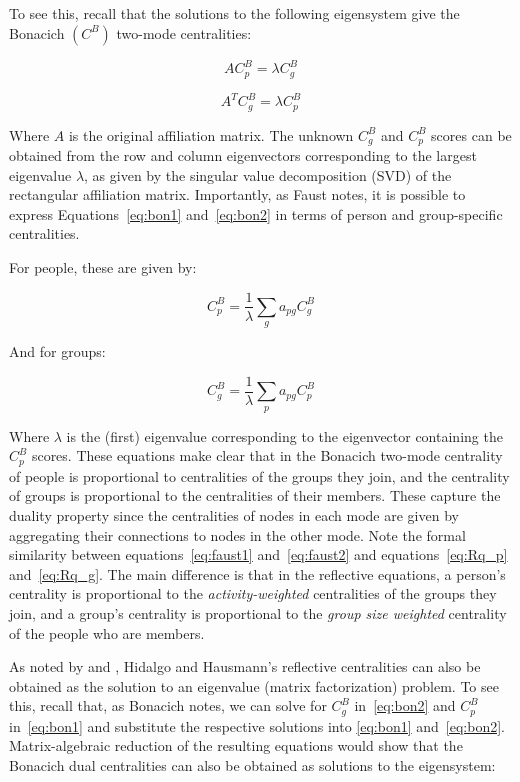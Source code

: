 \documentclass[a4paper,fleqn]{cas-sc}
\begin{document}
To see this, recall that the solutions to the following eigensystem give the Bonacich $(C^B)$ two-mode centralities:

\begin{equation}
    AC^B_p = \lambda C^B_g 
    \label{eq:bon1}
\end{equation}

\begin{equation}
    A^TC^B_g = \lambda C^B_p 
    \label{eq:bon2}
\end{equation}

Where $A$ is the original affiliation matrix. The unknown $C^B_g$ and $C^B_p$ scores can be obtained from the row and column eigenvectors corresponding to the largest eigenvalue $\lambda$, as given by the singular value decomposition (SVD) of the rectangular affiliation matrix. Importantly, as Faust \citeyearpar[170]{faust1997centrality} notes, it is possible to express Equations~\ref{eq:bon1} and~\ref{eq:bon2} in terms of person and group-specific centralities. 

For people, these are given by: 

\begin{equation}
    C^B_p = \frac{1}{\lambda}\sum_{g}a_{pg}C^B_g
    \label{eq:faust1}
\end{equation}

And for groups:

\begin{equation}
    C^B_g = \frac{1}{\lambda}\sum_{p}a_{pg}C^B_p
    \label{eq:faust2}
\end{equation}

Where $\lambda$ is the (first) eigenvalue corresponding to the eigenvector containing the $C^B_p$ scores. These equations make clear that in the Bonacich two-mode centrality of people is proportional to centralities of the groups they join, and the centrality of groups is proportional to the centralities of their members. These capture the duality property since the centralities of nodes in each mode are given by aggregating their connections to nodes in the other mode. Note the formal similarity between equations~\ref{eq:faust1} and~\ref{eq:faust2} and equations~\ref{eq:Rq_p} and~\ref{eq:Rq_g}. The main difference is that in the reflective equations, a person's centrality is proportional to the \textit{activity-weighted} centralities of the groups they join, and a group's centrality is proportional to the \textit{group size weighted} centrality of the people who are members.

As noted by \citet{mealy2019interpreting} and \citet{van2021correspondence}, Hidalgo and Hausmann's \citeyearpar{hidalgo2009building} reflective centralities can also be obtained as the solution to an eigenvalue (matrix factorization) problem. To see this, recall that, as Bonacich \citeyearpar[157]{bonacich1991simultaneous} notes, we can solve for $C^B_g$ in~\ref{eq:bon2} and $C^B_p$ in~\ref{eq:bon1} and substitute the respective solutions into \ref{eq:bon1} and~\ref{eq:bon2}. Matrix-algebraic reduction of the resulting equations would show that the Bonacich dual centralities can also be obtained as solutions to the eigensystem:
\end{document}
